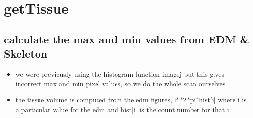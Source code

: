 \documentclass[11pt]{article}
\author{adam}
\date{\today}
\title{}
\begin{document}
\tableofcontents


\section{getTissue}
\label{sec:orgae28fe8}
\subsection{calculate the max and min values from EDM \& Skeleton}
\label{sec:org8bc32cb}
\begin{itemize}
\item we were previously using the histogram function imagej but this
gives incorrect max and min pixel values, so we do the whole scan
ourselves
\item the tissue volume is computed from the edm figures,
i**2*pi*hist[i] where i is a particular value for the edm and
hist[i] is the count number for that i
\end{itemize}
\end{document}
